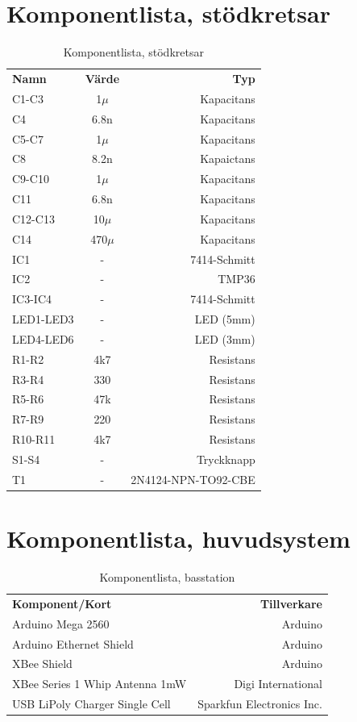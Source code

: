 \documentclass[a4paper,11pt]{article}
\begin{document}
\section{Komponentlista, stödkretsar}

\begin{table}[h]
\centering
	\begin{tabular}{|l|c|r|}
	{\bf Namn} & {\bf Värde} & {\bf Typ} \\
	C1-C3			& 1$\mu$	& Kapacitans \\
	C4			& 6.8n		& Kapacitans \\		
	C5-C7			& 1$\mu$	& Kapacitans \\
	C8			& 8.2n		& Kapaictans \\
	C9-C10			& 1$\mu$	& Kapacitans \\
	C11			& 6.8n		& Kapacitans \\
	C12-C13			& 10$\mu$	& Kapacitans \\
	C14			& 470$\mu$	& Kapacitans \\
	IC1			& -		& 7414-Schmitt \\
	IC2			& -		& TMP36 \\
	IC3-IC4			& -		& 7414-Schmitt \\
	LED1-LED3		& -		& LED (5mm) \\
	LED4-LED6		& -		& LED (3mm) \\
	R1-R2			& 4k7		& Resistans \\
	R3-R4			& 330		& Resistans \\
	R5-R6			& 47k		& Resistans \\
	R7-R9			& 220		& Resistans \\
	R10-R11			& 4k7		& Resistans \\
	S1-S4			& -		& Tryckknapp \\
	T1                      & -		& 2N4124-NPN-TO92-CBE \\
	\end{tabular}
\caption{Komponentlista, stödkretsar}
\label{tab:komponenttable}
\end{table}
\pagebreak

\section{Komponentlista, huvudsystem}

\begin{table}[h]
\centering
	\begin{tabular}{|l|r|}
	{\bf Komponent/Kort} & {\bf Tillverkare} \\
	Arduino Mega 2560                  & Arduino \\
	Arduino Ethernet Shield            & Arduino \\
	XBee Shield                        & Arduino \\
	XBee Series 1 Whip Antenna 1mW     & Digi International \\
	USB LiPoly Charger Single Cell     & Sparkfun Electronics Inc. \\
	\end{tabular}
\caption{Komponentlista, basstation}
\label{tab:korttable_bas}
\end{table}
\end{document}

